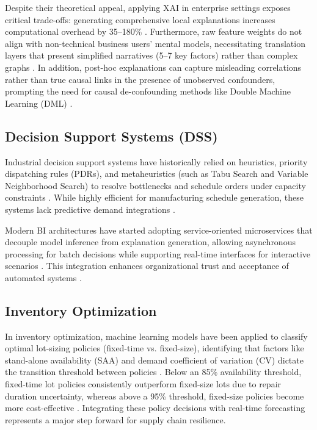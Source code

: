 \documentclass[conference]{IEEEtran}
\begin{document}
Despite their theoretical appeal, applying XAI in enterprise settings exposes critical trade-offs: generating comprehensive local explanations increases computational overhead by 35--180\% \cite{narlawar2025explainable}. Furthermore, raw feature weights do not align with non-technical business users' mental models, necessitating translation layers that present simplified narratives (5--7 key factors) rather than complex graphs \cite{narlawar2025explainable}. In addition, post-hoc explanations can capture misleading correlations rather than true causal links in the presence of unobserved confounders, prompting the need for causal de-confounding methods like Double Machine Learning (DML) \cite{gupta2025causal}.

\subsection{Decision Support Systems (DSS)}
Industrial decision support systems have historically relied on heuristics, priority dispatching rules (PDRs), and metaheuristics (such as Tabu Search and Variable Neighborhood Search) to resolve bottlenecks and schedule orders under capacity constraints \cite{spanos2022application}. While highly efficient for manufacturing schedule generation, these systems lack predictive demand integrations \cite{spanos2022application}. 

Modern BI architectures have started adopting service-oriented microservices that decouple model inference from explanation generation, allowing asynchronous processing for batch decisions while supporting real-time interfaces for interactive scenarios \cite{madabhushini2025explainable}. This integration enhances organizational trust and acceptance of automated systems \cite{chaganti2026advancing}.

\subsection{Inventory Optimization}
In inventory optimization, machine learning models have been applied to classify optimal lot-sizing policies (fixed-time vs. fixed-size), identifying that factors like stand-alone availability (SAA) and demand coefficient of variation (CV) dictate the transition threshold between policies \cite{tiwari2026explainable}. Below an 85\% availability threshold, fixed-time lot policies consistently outperform fixed-size lots due to repair duration uncertainty, whereas above a 95\% threshold, fixed-size policies become more cost-effective \cite{tiwari2026explainable}. Integrating these policy decisions with real-time forecasting represents a major step forward for supply chain resilience.
\end{document}
